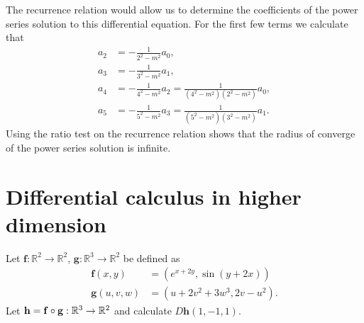\begin{solution}
$$    $$
    The recurrence relation would allow us to determine the coefficients of the power series solution to this differential equation.
    For the first few terms we calculate that
    $$
        \begin{aligned}
            a_2 & =  - \frac{1}{2^2 - m^2}a_{0},                                          \\
            a_3 & =  - \frac{1}{3^2 - m^2}a_{1},                                          \\
            a_4 & =  - \frac{1}{4^2 - m^2}a_{2} = \frac{1}{(4^2 - m^2)(2^2 - m^2)} a_{0}, \\
            a_5 & =  - \frac{1}{5^2 - m^2}a_{3} = \frac{1}{(5^2 - m^2)(3^2 - m^2)}a_{1}.
        \end{aligned}
    $$
    Using the ratio test on the recurrence relation shows that the radius of converge of the power series solution is infinite.
\end{solution}





\section{Differential calculus in higher dimension}

\begin{task}
    Let $\mathbf{f}:\mathbb{R}^2\to\mathbb{R}^2$, $\mathbf{g}:\mathbb{R}^3\to\mathbb{R}^2$ be defined as
    \[
        \begin{aligned}
            \mathbf{f}(x,y)   & = (e^{x+2y}, \sin(y+2x)) \\
            \mathbf{g}(u,v,w) & = (u+2v^2+3w^3,2v-u^2).
        \end{aligned}
    \]
    Let $\mathbf{h} =\mathbf{f} \circ \mathbf{g} : \mathbb{R}^3 \to \mathbb{R}^2$ and calculate \(D\mathbf{h}(1,-1,1)\).
\end{task}

